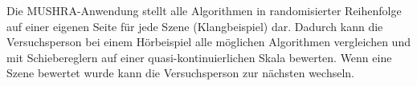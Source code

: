Die MUSHRA-Anwendung stellt alle Algorithmen in randomisierter Reihenfolge auf einer eigenen Seite für jede Szene (Klangbeispiel) dar. Dadurch kann die Versuchsperson bei einem Hörbeispiel alle möglichen Algorithmen vergleichen und mit Schiebereglern auf einer quasi-kontinuierlichen Skala bewerten. Wenn eine Szene bewertet wurde kann die Versuchsperson zur nächsten wechseln.
